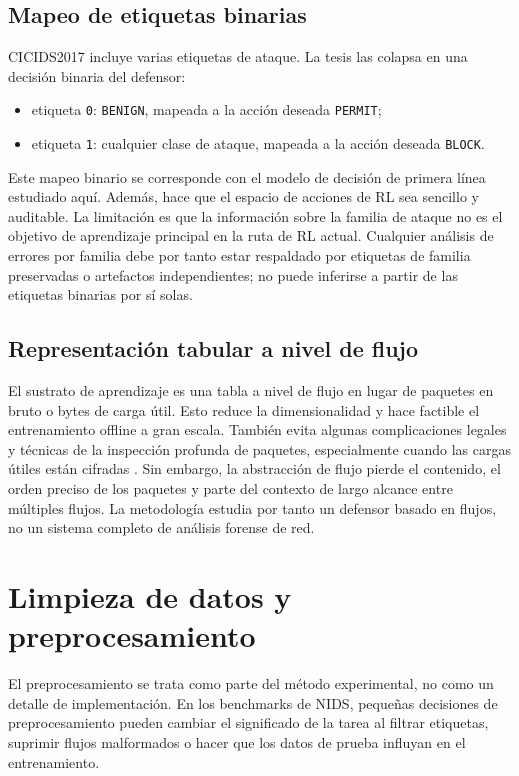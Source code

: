 \subsection{Mapeo de etiquetas binarias}
CICIDS2017 incluye varias etiquetas de ataque. La tesis las colapsa en una decisión binaria del defensor:
\begin{itemize}
    \item etiqueta \texttt{0}: \texttt{BENIGN}, mapeada a la acción deseada \texttt{PERMIT};
    \item etiqueta \texttt{1}: cualquier clase de ataque, mapeada a la acción deseada \texttt{BLOCK}.
\end{itemize}

Este mapeo binario se corresponde con el modelo de decisión de primera línea estudiado aquí. Además, hace que el espacio de acciones de RL sea sencillo y auditable. La limitación es que la información sobre la familia de ataque no es el objetivo de aprendizaje principal en la ruta de RL actual. Cualquier análisis de errores por familia debe por tanto estar respaldado por etiquetas de familia preservadas o artefactos independientes; no puede inferirse a partir de las etiquetas binarias por sí solas.

\subsection{Representación tabular a nivel de flujo}
El sustrato de aprendizaje es una tabla a nivel de flujo en lugar de paquetes en bruto o bytes de carga útil. Esto reduce la dimensionalidad y hace factible el entrenamiento offline a gran escala. También evita algunas complicaciones legales y técnicas de la inspección profunda de paquetes, especialmente cuando las cargas útiles están cifradas \parencite{Sperotto2010FlowIDS,Umer2017FlowIDS}. Sin embargo, la abstracción de flujo pierde el contenido, el orden preciso de los paquetes y parte del contexto de largo alcance entre múltiples flujos. La metodología estudia por tanto un defensor basado en flujos, no un sistema completo de análisis forense de red.

\section{Limpieza de datos y preprocesamiento}
El preprocesamiento se trata como parte del método experimental, no como un detalle de implementación. En los benchmarks de NIDS, pequeñas decisiones de preprocesamiento pueden cambiar el significado de la tarea al filtrar etiquetas, suprimir flujos malformados o hacer que los datos de prueba influyan en el entrenamiento.


